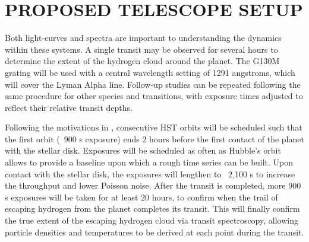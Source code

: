 \documentclass[onecolumn]{aastex63}
\begin{document}
\newpage
\section{PROPOSED TELESCOPE SETUP}

Both light-curves and spectra are important to understanding the dynamics within these systems. A single transit may be observed for several hours to determine the extent of the hydrogen cloud around the planet. The G130M grating will be used with a central wavelength setting of 1291 angstroms, which will cover the Lyman Alpha line. Follow-up studies can be repeated following the same procedure for other species and transitions, with exposure times adjusted to reflect their relative transit depths.

Following the motivations in \cite{2003Natur.422..143V}, consecutive HST orbits will be scheduled  such  that  the  first  orbit  (~900 s  exposure)  ends 2 hours before the first contact of the planet with the stellar disk. Exposures will be scheduled as often as Hubble's orbit allows to provide a baseline upon which a rough time series can be built. Upon contact with the stellar disk, the exposures will lengthen to ~2,100 s to increase the throughput and lower Poisson noise. After the transit is completed, more 900 s exposures will be taken for at least 20 hours, to confirm when the trail of escaping hydrogen from the planet completes its transit. This will finally confirm the true extent of the escaping hydrogen cloud via transit spectroscopy, allowing particle densities and temperatures to be derived at each point during the transit.

{}

\end{document}
